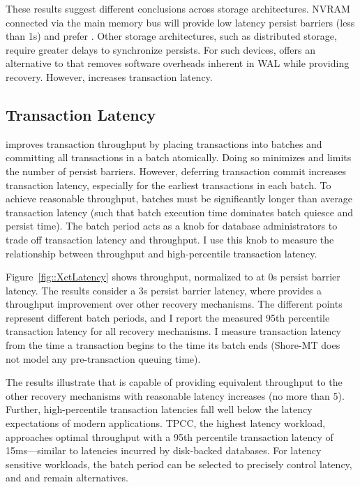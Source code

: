 These results suggest different conclusions across storage architectures.
NVRAM connected via the main memory bus will provide low latency persist barriers (less than 1\textmu s) and prefer \InPlace.
Other storage architectures, such as distributed storage, require greater delays to synchronize persists.
For such devices, \GroupCommit offers an alternative to \NVDisk that removes software overheads inherent in WAL while providing recovery.
However, \GroupCommit increases transaction latency.

\subsection{Transaction Latency}
\label{sec:OLTP_eval:Persists:XctLatency}



\GroupCommit improves transaction throughput by placing transactions into batches and committing all transactions in a batch atomically.
Doing so minimizes and limits the number of persist barriers.
However, deferring transaction commit increases transaction latency, especially for the earliest transactions in each batch.
To achieve reasonable throughput, batches must be significantly longer than average transaction latency (such that batch execution time dominates batch quiesce and persist time).
The batch period acts as a knob for database administrators to trade off transaction latency and throughput.
I use this knob to measure the relationship between throughput and high-percentile transaction latency.

Figure~\ref{fig::XctLatency} shows throughput, normalized to \InPlace at 0\textmu s persist barrier latency.
The results consider a 3\textmu s persist barrier latency, where \GroupCommit provides a throughput improvement over other recovery mechanisms.
The different \GroupCommit points represent different batch periods, and I report the measured 95th percentile transaction latency for all recovery mechanisms.
I measure transaction latency from the time a transaction begins to the time its batch ends (Shore-MT does not model any pre-transaction queuing time).

The results illustrate that \GroupCommit is capable of providing equivalent throughput to the other recovery mechanisms with reasonable latency increases (no more than 5\texttimes).
Further, high-percentile transaction latencies fall well below the latency expectations of modern applications.
TPCC, the highest latency workload, approaches optimal throughput with a 95th percentile transaction latency of 15ms---similar to latencies incurred by disk-backed databases.
For latency sensitive workloads, the batch period can be selected to precisely control latency, and \InPlace and \NVDisk remain alternatives.

